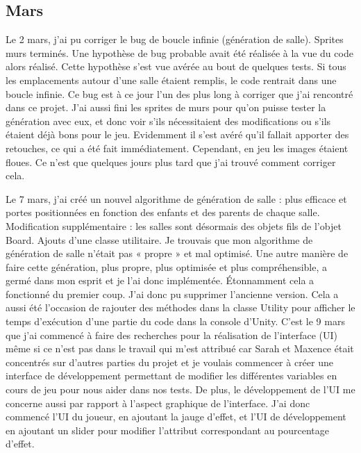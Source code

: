 \documentclass[]{extarticle}
\begin{document}
\begin{spacing}{1.25}
\subsection{Mars}
\bigbreak
\bigbreak
Le 2 mars, j'ai pu corriger le bug de boucle infinie (génération de salle). Sprites murs terminés.
\bigbreak
Une hypothèse de bug probable avait été réalisée à la vue du code alors réalisé. Cette hypothèse s’est vue avérée au bout de quelques tests. Si tous les emplacements autour d'une salle étaient remplis, le code rentrait dans une boucle infinie. Ce bug est à ce jour l’un des plus long à corriger que j’ai rencontré dans ce projet. J'ai aussi fini les sprites de murs pour qu’on puisse tester la génération avec eux, et donc voir s'ils nécessitaient des modifications ou s'ils étaient déjà bons pour le jeu. Evidemment il s'est avéré qu'il fallait apporter des retouches, ce qui a été fait immédiatement. Cependant, en jeu les images étaient floues. Ce n'est que quelques jours plus tard que j'ai trouvé comment corriger cela.

\bigbreak
\bigbreak
Le 7 mars, j'ai créé un nouvel algorithme de génération de salle : plus efficace et portes positionnées en fonction des enfants et des parents de chaque salle. Modification supplémentaire : les salles sont désormais des objets fils de l’objet Board. Ajouts d’une classe utilitaire.
\bigbreak
Je trouvais que mon algorithme de génération de salle n'était pas « propre » et mal optimisé. Une autre manière de faire cette génération, plus propre, plus optimisée et plus compréhensible, a germé dans mon esprit et je l'ai donc implémentée. Étonnamment cela a fonctionné du premier coup. J'ai donc pu supprimer l’ancienne version. Cela a aussi été l'occasion de rajouter des méthodes dans la classe Utility pour afficher le temps d’exécution d’une partie du code dans la console d'Unity.
\bigbreak
C'est le 9 mars que j'ai commencé à faire des recherches pour la réalisation de l'interface (UI) même si ce n’est pas dans le travail qui m'est attribué car Sarah et Maxence était concentrés sur d'autres parties du projet et je voulais commencer à créer une interface de développement permettant de modifier les différentes variables en cours de jeu pour nous aider dans nos tests. De plus, le développement de l'UI me concerne aussi par rapport à l'aspect graphique de l’interface. J'ai donc commencé l'UI du joueur, en ajoutant la jauge d'effet, et l'UI de développement en ajoutant un slider pour modifier l'attribut correspondant au pourcentage d'effet.
\newpage


\end{spacing}
\end{document}
